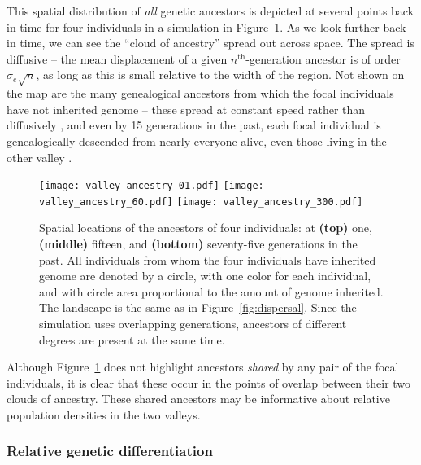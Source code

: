 \documentclass{ar-1col}
\renewcommand{\emph}[1]{{\textit{#1}}}
\begin{document}
This spatial distribution of \emph{all} genetic ancestors is depicted 
at several points back in time
for four individuals in a simulation in Figure~\ref{ancestry_spread}.
As we look further back in time,
we can see the ``cloud of ancestry'' spread out across space.
The spread is diffusive --
the mean displacement of a given $n^\text{th}$-generation ancestor 
is of order $\sigma_e \sqrt{n}$,
as long as this is small relative to the width of the region.
Not shown on the map are the many genealogical ancestors
from which the focal individuals have not inherited genome --
these spread at constant speed rather than diffusively \citep{kelleher2016spread},
and even by 15 generations in the past,
each focal individual is genealogically descended from nearly everyone alive,
even those living in the other valley \citep{chang1999}.

\begin{figure}	%
        \texttt{[image: valley\_ancestry\_01.pdf]}
        \texttt{[image: valley\_ancestry\_60.pdf]}
        \texttt{[image: valley\_ancestry\_300.pdf]}
        \caption{
            Spatial locations of the ancestors of four individuals:
            at 
            \textbf{(top)} one, 
            \textbf{(middle)} fifteen, and
            \textbf{(bottom)} seventy-five generations in the past.
            All individuals from whom the four individuals have inherited genome are denoted by a circle,
            with one color for each individual,
            and with circle area proportional to the amount of genome inherited.
            The landscape is the same as in Figure~\ref{fig:dispersal}.
            Since the simulation uses overlapping generations,
            ancestors of different degrees are present at the same time.
        }
        \label{ancestry_spread}
\end{figure}

Although Figure~\ref{ancestry_spread} does not highlight 
ancestors \emph{shared} by any pair of the focal individuals,
it is clear that these occur in the points of overlap between their two clouds of ancestry.
These shared ancestors may be informative about relative population densities in the two valleys.


\subsubsection{Relative genetic differentiation}
\end{document}
